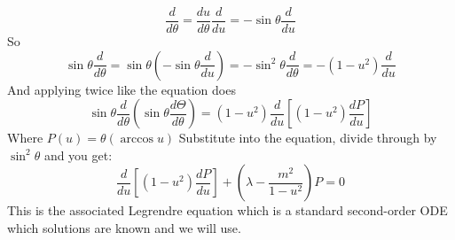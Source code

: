 \documentclass{article}
\begin{document}
\[
  \frac{d}{d\theta}
  = \frac{du}{d\theta}\frac{d}{du}
  = -\sin\theta\frac{d}{du}
\]
So
\[
\sin\theta\frac{d}{d\theta} = \sin\theta(-\sin\theta\frac{d}{du}) = -\sin^2\theta\frac{d}{d\theta} = -(1-u^2)\frac{d}{du}
\]
And applying twice like the equation does
\[
\sin\theta\frac{d}{d\theta}(\sin\theta\frac{d\Theta}{d\theta}) = (1-u^2)\frac{d}{du}[(1-u^2)\frac{dP}{du}]
\]
Where $P(u) = \theta(\arccos u)$
Substitute into the equation, divide through by $\sin^2\theta$ and you get:
\[
  \frac{d}{du}\!\left[(1-u^2)\frac{dP}{du}\right]
  + \left(\lambda - \frac{m^2}{1-u^2}\right)P = 0
\]
This is the associated Legrendre equation which is a standard second-order ODE which solutions are known and we will use.
\end{document}
